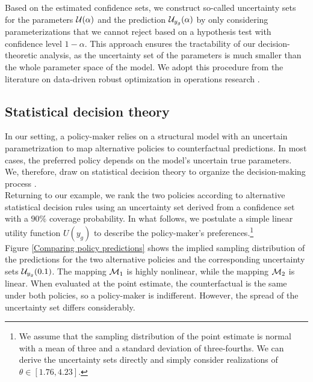 \noindent Based on the estimated confidence sets, we construct so-called uncertainty sets for the parameters $\mathcal{U}(\alpha)$ and the prediction $\mathcal{U}_{y_g}(\alpha)$ by only considering parameterizations that we cannot reject based on a hypothesis test with confidence level $1 - \alpha$. This approach ensures the tractability of our decision-theoretic analysis, as the uncertainty set of the parameters is much smaller than the whole parameter space of the model. We adopt this procedure from the literature on data-driven robust optimization in operations research \citep{Ben-Tal.2013,Bertsimas.2018}.
\subsection{Statistical decision theory}\label{Statistical decision theory}
\noindent In our setting, a policy-maker relies on a structural model with an uncertain parametrization to map alternative policies to counterfactual predictions. In most cases, the preferred policy depends on the model's uncertain true parameters. We, therefore, draw on statistical decision theory to organize the decision-making process \citep{Gilboa.2009,Marinacci.2015}.\\

\noindent Returning to our example, we rank the two policies according to alternative statistical decision rules using an uncertainty set derived from a confidence set with a $90\%$ coverage probability. In what follows, we postulate a simple linear utility function $U(y_g)$ to describe the policy-maker's preferences.\footnote{We assume that the sampling distribution of the point estimate is normal with a mean of three and a standard deviation of three-fourths. We can derive the uncertainty sets directly and simply consider realizations of $\theta\in[1.76, 4.23]$.}\\

\noindent Figure \ref{Comparing policy predictions} shows the implied sampling distribution of the predictions for the two alternative policies and the corresponding uncertainty sets $\mathcal{U}_{y_g}(0.1)$. The mapping $\mathcal{M}_1$ is highly nonlinear, while the mapping $\mathcal{M}_{2}$ is linear. When evaluated at the point estimate, the counterfactual is the same under both policies, so a policy-maker is indifferent. However, the spread of the uncertainty set differs considerably.\\

